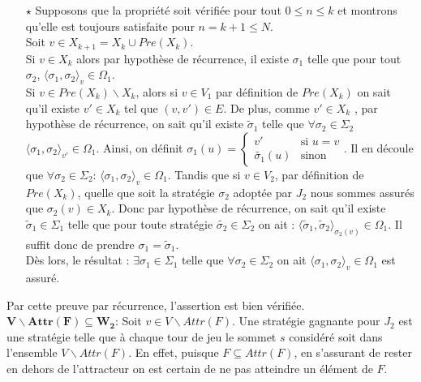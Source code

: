 \begin{demonstration}
\begin{enumerate}
			\item[$\star$] Supposons que la propriété soit vérifiée pour tout $ 0 \leq n \leq k $ et montrons qu'elle est toujours satisfaite pour $n = k + 1 \leq N$. \\
			Soit $v \in X_{k+1} = X_{k} \cup Pre(X_{k})$. \\
			Si $v \in X_{k}$ alors par hypothèse de récurrence, il existe $\sigma _{1}$ telle que pour tout $\sigma_2$, $ \langle \sigma _{1},\sigma _{2} \rangle_v \in \Omega _{1}$.\\
			Si $v \in Pre(X_{k})\backslash X_k$, alors si $v \in V_{1}$ par définition de $Pre(X_{k})$ on sait qu'il existe $v'\in X_{k}$ tel que $(v,v')\in E$. De plus, comme $v' \in X_k$ , par hypothèse de récurrence, on sait qu'il existe $\tilde{\sigma}_1$ telle que $\forall \sigma_2 \in \Sigma_2$ $\langle \sigma_1, \sigma_2 \rangle_{v'} \in \Omega_1$. Ainsi, on définit $\sigma _{1}(u) =\begin{cases} v' & \text{si } u = v \\ \tilde{\sigma_1}(u) & \text{sinon} \end{cases}$. Il en découle que $\forall \sigma_2 \in \Sigma_2$: $\langle \sigma_1, \sigma_2 \rangle_v \in \Omega_1$.
			 Tandis que si $v \in V_{2}$, par définition de $Pre(X_k)$, quelle que soit la stratégie $\sigma _{2}$ adoptée par $J_{2}$  nous sommes assurés que $\sigma _{2}(v) \in X_{k}$. Donc par hypothèse de récurrence, on sait qu'il existe $\tilde{\sigma}_1 \in \Sigma_1$ telle que pour toute stratégie $\tilde{\sigma_2} \in \Sigma_2$ on ait : $\langle \tilde{\sigma}_1, \tilde{\sigma}_2 \rangle_{\sigma_2(v)} \in \Omega_1$. Il suffit donc de prendre $\sigma_1  = \tilde{\sigma}_1$.\\
			
			 Dès lors, le résultat : $\exists \sigma_1 \in \Sigma_1$ telle que $\forall \sigma_2 \in \Sigma_2$ on ait \linebreak $ \langle \sigma _{1},\sigma _{2} \rangle_v \in \Omega _{1}$ est assuré.
		\end{enumerate}
		Par cette preuve par récurrence, l'assertion est bien vérifiée.\\
		
		\noindent$\mathbf{V \backslash Attr(F) \subseteq W_{2}}$: Soit $v \in V \backslash Attr(F)$. Une stratégie gagnante pour $J_{2}$ est une stratégie telle que à chaque tour de jeu le sommet $s$ considéré soit dans l'ensemble $V\backslash Attr(F)$. En effet, puisque $F \subseteq Attr(F)$, en s'assurant de rester en dehors de l'attracteur on est certain de ne pas atteindre un élément de $F$.\\
		

\end{demonstration}
